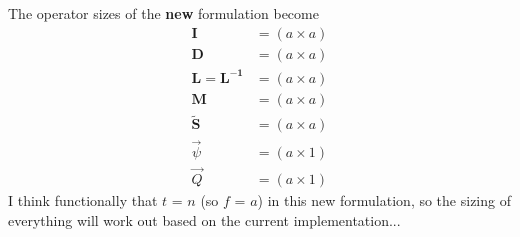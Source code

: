 \documentclass[12pt,twoside]{article}
\newcommand{\ve}[1]{\ensuremath{\mathbf{#1}}}
\begin{document}
The operator sizes of the \textbf{new} formulation become
\begin{align*}
\ve{I} &= (a \times a) \\
\ve{D} &= (a \times a) \\
\ve{L} = \ve{L^{-1}} &= (a \times a) \\
\ve{M} &= (a \times a) \\
\ve{\tilde{S}} &= (a \times a) \\
\vec{\psi} &= (a \times 1) \\
\vec{Q} &= (a \times 1)
\end{align*}
I think functionally that $t$ = $n$ (so $f$ = $a$) in this new formulation, so the sizing of everything will work out based on the current implementation...
\end{document}
